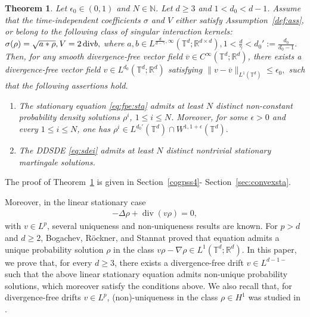 \documentclass[UTF-8,reqno]{amsart}
\numberwithin{equation}{section}
\newtheorem{theorem}{Theorem}[section]
\theoremstyle{definition}
\def\geq{\geqslant}
\def\leq{\leqslant}
\def\div{\mathord{{\rm div}}}
\def\geq{\geqslant}
\def\leq{\leqslant}
\def\div{\mathord{{\rm div}}}
\begin{document}
\begin{theorem}\label{thm:sta}
Let $\epsilon_0\in(0,1)$ and $N\in\mathbb{N}$. Let $d\geq 3$ and
$1<d_0<d-1$. Assume that the time-independent coefficients $\sigma$ and $V$
either satisfy Assumption~\ref{def:ass}, or belong to the following class of
singular interaction kernels:
$
\sigma(\rho)=\sqrt{a*\rho},
V=2\,\div b,
$
where $
a,b\in
L^{\frac{d}{d-\gamma},\infty}
(\mathbb{T}^d;\mathbb{R}^{d\times d}),
1<\frac{d}{\gamma}<d_0':=\frac{d_0}{d_0-1}.
$ 
Then, for any smooth divergence-free vector field
$\overline v\in C^\infty(\mathbb{T}^d;\mathbb{R}^d)$, there exists a
divergence-free vector field
$
v\in L^{d_0}(\mathbb{T}^d;\mathbb{R}^d)
$
satisfying $\|v-\overline v\|_{L^1(\mathbb{T}^d)}
\leq
\epsilon_0,$ 
such that the following assertions hold.

\begin{enumerate}
\item
The stationary equation \eqref{eq:fpe:sta} admits at least $N$ distinct
non-constant probability density solutions $\rho^i$, $1\leq i\leq N$.
Moreover, for some $\epsilon>0$ and every $1\leq i\leq N$, one has
$
\rho^i
\in
L^{d_0'}(\mathbb{T}^d)
\cap
W^{1,1+\epsilon}(\mathbb{T}^d).
$

\item
The DDSDE \eqref{eq:sdei} admits at least $N$ distinct nontrivial stationary
martingale solutions.  
\end{enumerate}
\end{theorem}
The proof of Theorem~\ref{thm:sta} is given in Section~\ref{cogpss4}- Section~\ref{sec:convexsta}.


Moreover, in the linear stationary case
\begin{align*}
-\Delta\rho+\operatorname{div}(v\rho)=0,
\end{align*}
with $v\in L^p $, several uniqueness and
non-uniqueness results are known. For $p>d$ and $d\geq 2$, Bogachev,
R\"ockner, and Stannat \cite{BRS02} proved  that equation admits a unique
probability solution $\rho$ in the class $v\rho-\nabla\rho\in L^1 (\mathbb{T}^d;\mathbb{R}^d)$.
In this paper, we prove that, for every $d\geq 3$, there
exists a divergence-free drift
$
v\in L^{d-1-} 
$
such that the above linear stationary equation admits non-unique probability
solutions, which moreover satisfy the conditions above.   We also recall that, for divergence-free drifts
$v\in L^p $, (non)-uniqueness in the class
$\rho\in H^1 $ was studied in \cite{Zhi04,CO22}.

   
\end{document}
